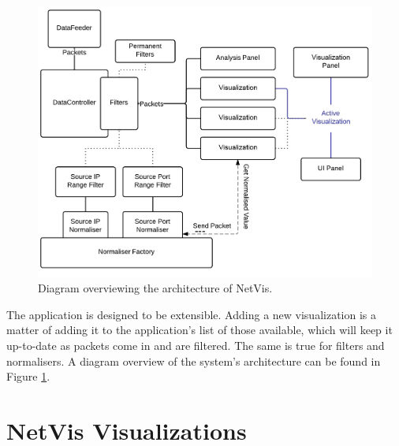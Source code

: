 \begin{figure}[htb]
   \centering
   \includegraphics[width=\linewidth]{materials/architecture.jpg}
   \caption[Architecture]{\label{fig:architecture}
         Diagram overviewing the architecture of NetVis.}
\end{figure}

The application is designed to be extensible. Adding a new visualization is a matter
of adding it to the application's list of those available, which will keep it up-to-date
as packets come in and are filtered. The same is true for filters and normalisers. A diagram
overview of the system's architecture can be found in Figure \ref{fig:architecture}.


\section{NetVis Visualizations} \label{sec:visuals}
